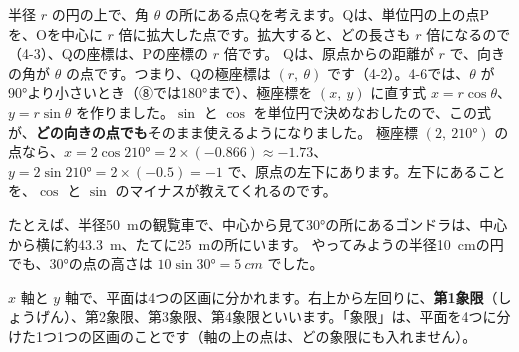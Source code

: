 半径 $r$ の円の上で、角 $\theta$ の所にある点Qを考えます。Qは、単位円の上の点Pを、Oを中心に $r$ 倍に拡大した点です。拡大すると、どの長さも $r$ 倍になるので（4-3）、Qの座標は、Pの座標の $r$ 倍です。
Qは、原点からの距離が $r$ で、向きの角が $\theta$ の点です。つまり、Qの極座標は $(r,\ \theta)$ です（4-2）。4-6では、$\theta$ が\ang{90}より小さいとき（⑧では\ang{180}まで）、極座標を $(x,\ y)$ に直す式 $x=r\cos\theta$、$y=r\sin\theta$ を作りました。$\sin$ と $\cos$ を単位円で決めなおしたので、この式が、\textbf{どの向きの点でも}そのまま使えるようになりました。
極座標 $(2,\ 210°)$ の点なら、$x=2\cos210°=2\times(-0.866)\approx-1.73$、$y=2\sin210°=2\times(-0.5)=-1$ で、原点の左下にあります。左下にあることを、$\cos$ と $\sin$ のマイナスが教えてくれるのです。

たとえば、半径\qty{50}{m}の観覧車で、中心から見て30°の所にあるゴンドラは、中心から横に約\qty{43.3}{m}、たてに\qty{25}{m}の所にいます。
やってみようの半径\qty{10}{cm}の円でも、30°の点の高さは $10\sin30°=\qty{5}{cm}$ でした。


\label{bk:4-8:shuki}
$x$ 軸と $y$ 軸で、平面は4つの区画に分かれます。右上から左回りに、\textbf{第1象限}（しょうげん）、第2象限、第3象限、第4象限といいます。「象限」は、平面を4つに分けた1つ1つの区画のことです（軸の上の点は、どの象限にも入れません）。

